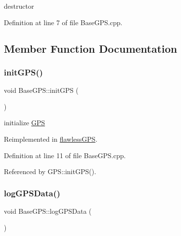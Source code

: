 destructor 



Definition at line 7 of file Base\+G\+P\+S.\+cpp.



\subsection{Member Function Documentation}
\mbox{\label{class_base_g_p_s_a68dbbdd67e5d9de606810377f1cec0e3}} 
\subsubsection{\texorpdfstring{init\+G\+P\+S()}{initGPS()}}
{\footnotesize\ttfamily void Base\+G\+P\+S\+::init\+G\+PS (\begin{DoxyParamCaption}{ }\end{DoxyParamCaption})\hspace{0.3cm}{\ttfamily [virtual]}}



initialize \hyperlink{class_g_p_s}{G\+PS} 



Reimplemented in \hyperlink{classflawless_g_p_s_a50cdffc0dc65e644f6191bc7c723521b}{flawless\+G\+PS}.



Definition at line 11 of file Base\+G\+P\+S.\+cpp.



Referenced by G\+P\+S\+::init\+G\+P\+S().

\mbox{\label{class_base_g_p_s_ad62094ad9ac6e9813cd65e63aeb7df13}} 
\subsubsection{\texorpdfstring{log\+G\+P\+S\+Data()}{logGPSData()}}
{\footnotesize\ttfamily void Base\+G\+P\+S\+::log\+G\+P\+S\+Data (\begin{DoxyParamCaption}{ }\end{DoxyParamCaption})\hspace{0.3cm}{\ttfamily [virtual]}}



